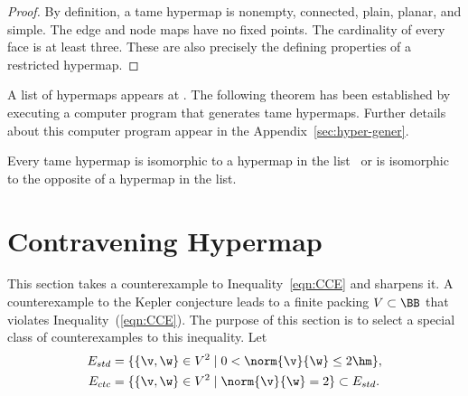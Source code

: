 \begin{proof}
  By definition, a tame hypermap is nonempty, connected, plain,
  planar, and simple.  The edge and node maps
  have no fixed points.  The cardinality of every face is at least
  three.  These are also precisely the defining properties of a restricted
  hypermap.
\end{proof}


A list of hypermaps appears at \cite{website:Hales:1998:Code}.  The following
theorem has been established by executing a computer program that generates
tame hypermaps.  Further details about this computer program appear in
the Appendix~\ref{sec:hyper-gener}.

%

\begin{theorem}
  \label{theorem:classification} Every tame hypermap is isomorphic to
  a hypermap in the list~\cite{website:Hales:1998:Code} or is
  isomorphic to the opposite of a hypermap in the list.
\end{theorem}



%
%

\section{Contravening Hypermap}

This section takes a counterexample to Inequality~\ref{eqn:CCE} and  sharpens it.
%
A counterexample to the Kepler conjecture leads to a finite packing
$V\subset \BB$ that violates Inequality~(\ref{eqn:CCE}).  The
purpose of this section is to select a special class of
counterexamples to this inequality.  Let
\begin{align}\label{eqn:fan-edge}
E_{std} &= \{\{\v,\w\}\in V^2\mid 0 < \norm{\v}{\w}\le 2\hm \},\\
E_{ctc} &= \{ \{\v,\w\}\in V^2\mid \norm{\v}{\w}= 2 \}\subset E_{std}.
\end{align}

